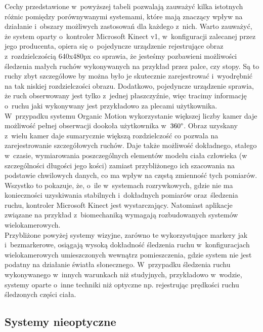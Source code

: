 Cechy przedstawione w~powyższej tabeli pozwalają zauważyć kilka istotnych różnic pomiędzy porównywanymi systemami, które mają znaczący wpływ na działanie i~obszary możliwych zastosowań dla każdego z~nich. Warto zauważyć, że system oparty o~kontroler Microsoft Kinect v1, w~konfiguracji zalecanej przez jego producenta, opiera się o~pojedyncze urządzenie rejestrujące obraz z~rozdzielczością 640x480px co sprawia, że jesteśmy pozbawieni możliwości śledzenia małych ruchów wykonywanych na przykład przez palce, czy stopy. Są to ruchy zbyt szczegółowe by można było je skutecznie zarejestrować i~wyodrębnić na tak niskiej rozdzielczości obrazu. Dodatkowo, pojedyncze urządzenie sprawia, że ruch obserwowany jest tylko z~jednej płaszczyźnie, więc tracimy informację o~ruchu jaki wykonywany jest przykładowo za plecami użytkownika. W~przypadku systemu Organic Motion wykorzystanie większej liczby kamer daje możliwość pełnej obserwacji dookoła użytkownika w~$360\degree$. Obraz uzyskany z~wielu kamer daje sumarycznie większą rozdzielczość co pozwala na zarejestrowanie szczegółowych ruchów. Daje także możliwość dokładnego, stałego w~czasie, wymiarowania poszczególnych elementów modelu ciała człowieka (w szczególności długości jego kości) zamiast przybliżonego ich szacowania na podstawie chwilowych danych, co ma wpływ na częstą zmienność tych pomiarów. Wszystko to pokazuje, że, o~ile w~systemach rozrywkowych, gdzie nie ma konieczności uzyskiwania stabilnych i~dokładnych pomiarów oraz~śledzenia ruchu, kontroler Microsoft Kinect jest wystarczający. Natomiast aplikacje związane na przykład z~biomechaniką wymagają rozbudowanych systemów wielokamerowych.\\
			
Przybliżone powyżej systemy wizyjne, zarówno te wykorzystujące markery jak i~bezmarkerowe, osiągają wysoką dokładność śledzenia ruchu w~konfiguracjach wielokamerowych umieszczonych wewnątrz pomieszczenia, gdzie system nie jest podatny na działanie światła słonecznego. W~przypadku śledzenia ruchu wykonywanego w~innych warunkach niż studyjnych, przykładowo w~wodzie, systemy oparte o~inne techniki niż optyczne np. rejestrując prędkości ruchu śledzonych części ciała.
			
\subsection{Systemy nieoptyczne}
			
